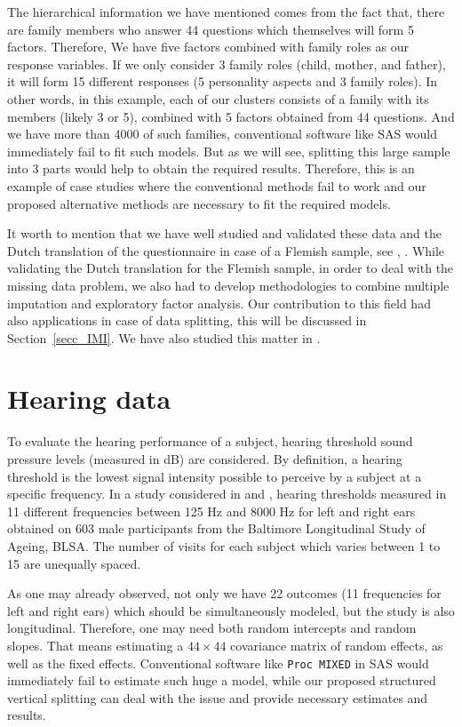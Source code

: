 \documentclass[11pt,a5paper,twoside]{book}
\begin{document}
The hierarchical information we have mentioned comes from the fact that, there are family members who answer 44 questions which themselves will form 5 factors. Therefore, We have five factors combined with family roles as our response variables. If we only consider 3 family roles (child, mother, and father), it will form 15 different responses (5 personality aspects and 3 family roles). In other words, in this example, each of our clusters consists of a family with its members (likely 3 or 5), combined with 5 factors obtained from 44 questions. And we have more than 4000 of such families, conventional software like SAS would immediately fail to fit such models. But as we will see, splitting this large sample into 3 parts would help to obtain the required results. Therefore, this is an example of case studies where the conventional methods fail to work and our proposed alternative methods are necessary to fit the required models.

It worth to mention that we have well studied and validated these data and the Dutch translation of the questionnaire in case of a Flemish sample, see \cite{lovik2017a}, \cite{lovik2017b}. While validating the Dutch translation for the Flemish sample, in order to deal with the missing data problem, we also had to develop methodologies to combine multiple imputation \citep{rubin1987, carpenter2012} and exploratory factor analysis. Our contribution to this field had also applications in case of data splitting, this will be discussed in Section~\ref{secc_IMI}. We have also studied this matter in \cite{lovik2017combining}.



\section{Hearing data} 
\label{mot_hearing}
To evaluate the hearing performance of a subject, hearing threshold sound pressure levels (measured in dB) are considered. By definition, a hearing threshold is the lowest signal intensity possible to perceive by a subject at a specific frequency. In a study considered in \cite{verbeke2009} and \cite{Verbeke2006}, hearing thresholds measured in 11 different frequencies between 125 Hz and 8000 Hz for left and right ears obtained on 603 male participants from the Baltimore Longitudinal Study of Ageing, BLSA. The number of visits for each subject which varies between 1 to 15 are unequally spaced. 

As one may already observed, not only we have 22 outcomes (11 frequencies for left and right ears) which should be simultaneously modeled, but the study is also longitudinal. Therefore, one may need both random intercepts and random slopes. That means estimating a $44 \times 44$ covariance matrix of random effects, as well as the fixed effects. Conventional software like {\tt{Proc MIXED}} in SAS would immediately fail to estimate such huge a model, while our proposed structured vertical splitting can deal with the issue and provide necessary estimates and results.
\end{document}

